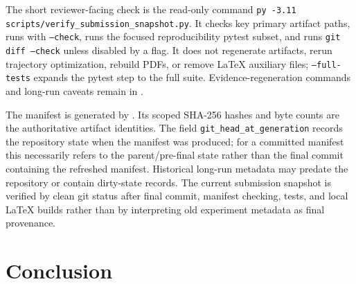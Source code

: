 \documentclass[preprint,12pt]{elsarticle}
\begin{document}
The short reviewer-facing check is the read-only command \texttt{py -3.11 scripts/verify\_submission\_snapshot.py}. It checks key primary artifact paths, runs  with \texttt{--check}, runs the focused reproducibility pytest subset, and runs \texttt{git diff --check} unless disabled by a flag. It does not regenerate artifacts, rerun trajectory optimization, rebuild PDFs, or remove LaTeX auxiliary files; \texttt{--full-tests} expands the pytest step to the full suite. Evidence-regeneration commands and long-run caveats remain in .

The manifest is generated by . Its scoped SHA-256 hashes and byte counts are the authoritative artifact identities. The field \texttt{git\_head\_at\_generation} records the repository state when the manifest was produced; for a committed manifest this necessarily refers to the parent/pre-final state rather than the final commit containing the refreshed manifest. Historical long-run metadata may predate the repository or contain dirty-state records. The current submission snapshot is verified by clean git status after final commit, manifest checking, tests, and local LaTeX builds rather than by interpreting old experiment metadata as final provenance.

\section{Conclusion}
\end{document}

